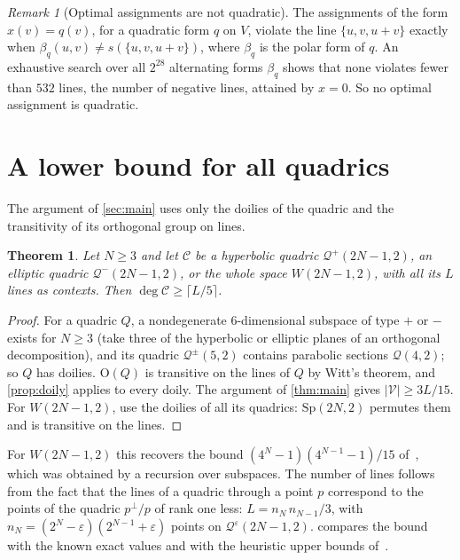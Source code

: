 \documentclass[11pt]{article}
\newtheorem{theorem}{Theorem}
\theoremstyle{definition}
\theoremstyle{remark}
\newtheorem{remark}[remark]{Remark}
\newcommand{\Qp}{\mathcal{Q}^{+}}
\newcommand{\Qm}{\mathcal{Q}^{-}}
\newcommand{\dg}{\operatorname{deg}}
\newcommand{\Sp}{\mathrm{Sp}}
\newcommand{\GO}{\mathrm{O}}
\begin{document}
\begin{remark}[Optimal assignments are not quadratic]
The assignments of the form $x(v)=q(v)$, for a quadratic form $q$ on $V$, violate the line $\{u,v,u+v\}$ exactly when $\beta_q(u,v)\ne s(\{u,v,u+v\})$, where $\beta_q$ is the polar form of $q$.
An exhaustive search over all $2^{28}$ alternating forms $\beta_q$ shows that none violates fewer than $532$ lines, the number of negative lines, attained by $x=0$.
So no optimal assignment is quadratic.
\end{remark}

\section{A lower bound for all quadrics}\label{sec:general}

The argument of \cref{sec:main} uses only the doilies of the quadric and the transitivity of its orthogonal group on lines.

\begin{theorem}\label{thm:general}
Let $N\ge3$ and let $\mathcal C$ be a hyperbolic quadric $\Qp(2N-1,2)$, an elliptic quadric $\Qm(2N-1,2)$, or the whole space $W(2N-1,2)$, with all its $L$ lines as contexts. Then $\dg\mathcal C\ge\lceil L/5\rceil$.
\end{theorem}
\begin{proof}
For a quadric $Q$, a nondegenerate $6$-dimensional subspace of type $+$ or $-$ exists for $N\ge3$ (take three of the hyperbolic or elliptic planes of an orthogonal decomposition), and its quadric $\mathcal Q^\pm(5,2)$ contains parabolic sections $\mathcal Q(4,2)$; so $Q$ has doilies.
$\GO(Q)$ is transitive on the lines of $Q$ by Witt's theorem, and \cref{prop:doily} applies to every doily.
The argument of \cref{thm:main} gives $|\mathcal V|\ge 3L/15$.
For $W(2N-1,2)$, use the doilies of all its quadrics: $\Sp(2N,2)$ permutes them and is transitive on the lines.
\end{proof}

For $W(2N-1,2)$ this recovers the bound $(4^N-1)(4^{N-1}-1)/15$ of~\cite[eq.~(11)]{Muller24}, which was obtained by a recursion over subspaces.
The number of lines follows from the fact that the lines of a quadric through a point $p$ correspond to the points of the quadric $p^\perp/p$ of rank one less: $L=n_N\,n_{N-1}/3$, with $n_N=(2^N-\varepsilon)(2^{N-1}+\varepsilon)$ points on $\mathcal Q^\varepsilon(2N-1,2)$.
 compares the bound with the known exact values and with the heuristic upper bounds of~\cite{Muller24}.
\end{document}

